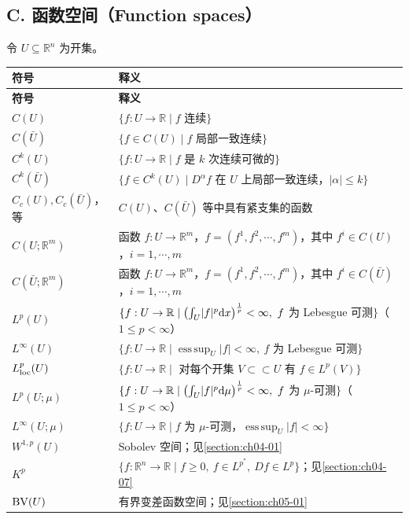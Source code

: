 \documentclass[../../main.tex]{subfiles}%
\begin{document}
\subsection*{C. 函数空间（Function spaces）}

令 $U\subseteq\mathbb{R}^n$ 为开集。

\begin{longtable}{@{}p{}p{}@{}}
\toprule
\textbf{符号} & \textbf{释义} \\
\midrule
\endfirsthead
\toprule
\textbf{符号} & \textbf{释义} \\
\midrule
\endhead
$C(U)$ & $\{f:U\to\mathbb{R}\mid f$ 连续$\}$ \\
$C(\bar U)$ & $\{f\in C(U)\mid f$ 局部一致连续$\}$ \\
$C^k(U)$ & $\{f:U\to\mathbb{R}\mid f$ 是 $k$ 次连续可微的$\}$ \\
$C^k(\bar U)$ & $\{f\in C^k(U)\mid D^\alpha f$ 在 $U$ 上局部一致连续，$\lvert\alpha\rvert\leqslant k\}$ \\
$C_c(U),C_c(\bar U)$，等 & $C(U)$、$C(\bar U)$ 等中具有紧支集的函数 \\
$C(U;\mathbb{R}^m)$ & 函数 $f:U\to\mathbb{R}^m$，$f=(f^1,f^2,\cdots,f^m)$，其中 $f^i\in C(U)$，$i=1,\cdots,m$ \\
$C(\bar U;\mathbb{R}^m)$ & 函数 $f:U\to\mathbb{R}^m$，$f=(f^1,f^2,\cdots,f^m)$，其中 $f^i\in C(\bar U)$，$i=1,\cdots,m$ \\
$L^p(U)$ & $\{f:U\to\mathbb{R}\mid\bigl(\int_U\lvert f\rvert^p\mathrm{d} x\bigr)^{\frac{1}{p}}<\infty,\ f$ 为 Lebesgue 可测$\}$（$1\leqslant p<\infty$） \\
$L^\infty(U)$ & $\{f:U\to\mathbb{R}\mid\operatorname{ess\,sup}_U\lvert f\rvert<\infty,\ f$ 为 Lebesgue 可测$\}$ \\
$L^p_{\mathrm{loc}}(U)$ & $\{f:U\to\mathbb{R}\mid$ 对每个开集 $V\subset\subset U$ 有 $f\in L^p(V)\}$ \\
$L^p(U;\mu)$ & $\{f:U\to\mathbb{R}\mid\bigl(\int_U\lvert f\rvert^p\mathrm{d}\mu\bigr)^{\frac{1}{p}}<\infty,\ f$ 为 $\mu$-可测$\}$（$1\leqslant p<\infty$） \\
$L^\infty(U;\mu)$ & $\{f:U\to\mathbb{R}\mid f$ 为 $\mu$-可测，$\operatorname{ess\,sup}_U\lvert f\rvert<\infty\}$ \\
$W^{1,p}(U)$ & Sobolev 空间；见\cref{section:ch04-01} \\%
$K^p$ & $\{f:\mathbb{R}^n\to\mathbb{R}\mid f\geqslant0,\ f\in L^{p^*},\ Df\in L^p\}$；见\cref{section:ch04-07} \\%
$\mathrm{BV}(U)$ & 有界变差函数空间；见\cref{section:ch05-01} \\%
\bottomrule
\end{longtable}
\end{document}
